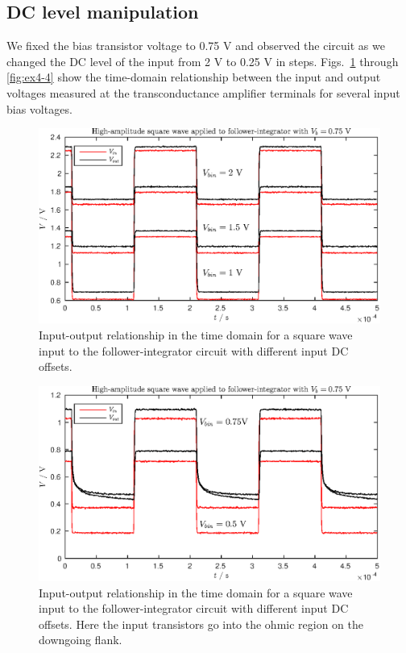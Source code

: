 \subsection{DC level manipulation}
We fixed the bias transistor voltage to 0.75 V and observed the circuit as we changed the DC level of the input from 2 V to 0.25 V in steps. Figs.~\ref{fig:ex4-2} through
\ref{fig:ex4-4} show the time-domain relationship between the input and output voltages measured at the transconductance amplifier terminals for several input bias voltages.
\begin{figure}[!htb]
    \center
    \includegraphics{ex4-1.eps}
    \caption{Input-output relationship in the time domain for a square wave input to the follower-integrator circuit with different input DC offsets.}
    \label{fig:ex4-2}
\end{figure}
\begin{figure}[!htb]
    \center
    \includegraphics{ex4-2.eps}
    \caption{Input-output relationship in the time domain for a square wave input to the follower-integrator circuit with different input DC offsets. Here the
    input transistors go into the ohmic region on the downgoing flank.}
    \label{fig:ex4-3}
\end{figure}

